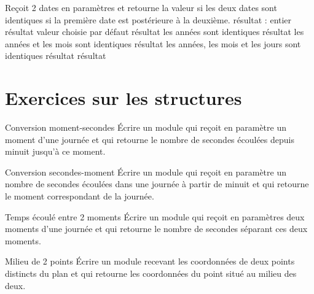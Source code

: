 	\begin{Pseudocode}
	\LComment Reçoit 2 dates en paramètres et retourne la valeur
	 si les deux	dates sont identiques
	 si la première date est postérieure à la deuxième.
		\Decl résultat : entier
		\Let  résultat 
		\RComment valeur choisie par défaut
				\Let  résultat 
			\Else \RComment les années sont identiques
						\Let  résultat 
					\Else \RComment les années et les mois sont identiques
								\Let  résultat 
							\Else \RComment les années, les mois et les jours sont identiques
								\Let  résultat 
							\EndIf
						\EndIf
					\EndIf
				\EndIf
			\EndIf
		\EndIf
		\Return résultat
	\EndModule
	\end{Pseudocode}

\section{Exercices sur les structures}

\begin{Exercice}{Conversion moment-secondes}
	Écrire un module qui reçoit en paramètre un
	moment d’une journée et qui retourne le nombre de secondes écoulées
	depuis minuit jusqu’à ce moment.
\end{Exercice}

\begin{Exercice}{Conversion secondes-moment}
	Écrire un module qui reçoit en paramètre un
	nombre de secondes écoulées dans une journée à partir de minuit et qui
	retourne le moment correspondant de la journée.
\end{Exercice}

\begin{Exercice}{Temps écoulé entre 2 moments}
	Écrire un module qui reçoit en paramètres deux
	moments d’une journée et qui retourne le nombre de secondes séparant
	ces deux moments.
\end{Exercice}

\begin{Exercice}{Milieu de 2 points}
	Écrire un module recevant les coordonnées de
	deux points distincts du plan et qui retourne les coordonnées du point
	situé au milieu des deux.
\end{Exercice}

